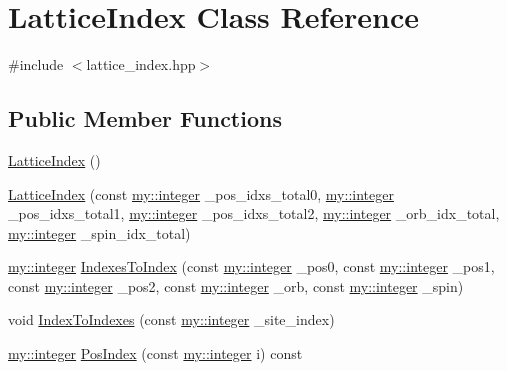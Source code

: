 \hypertarget{classLatticeIndex}{}\section{Lattice\+Index Class Reference}
\label{classLatticeIndex}


{\ttfamily \#include $<$lattice\+\_\+index.\+hpp$>$}

\subsection*{Public Member Functions}
\begin{DoxyCompactItemize}
\item 
\hyperlink{classLatticeIndex_a53dac5f33198813299277518c5adaa23}{Lattice\+Index} ()
\item 
\hyperlink{classLatticeIndex_a0c36fd22f06029d89e622fb6db91c081}{Lattice\+Index} (const \hyperlink{namespacemy_a42365393c537edae1e89d20ff90d1923}{my\+::integer} \+\_\+pos\+\_\+idxs\+\_\+total0, \hyperlink{namespacemy_a42365393c537edae1e89d20ff90d1923}{my\+::integer} \+\_\+pos\+\_\+idxs\+\_\+total1, \hyperlink{namespacemy_a42365393c537edae1e89d20ff90d1923}{my\+::integer} \+\_\+pos\+\_\+idxs\+\_\+total2, \hyperlink{namespacemy_a42365393c537edae1e89d20ff90d1923}{my\+::integer} \+\_\+orb\+\_\+idx\+\_\+total, \hyperlink{namespacemy_a42365393c537edae1e89d20ff90d1923}{my\+::integer} \+\_\+spin\+\_\+idx\+\_\+total)
\item 
\hyperlink{namespacemy_a42365393c537edae1e89d20ff90d1923}{my\+::integer} \hyperlink{classLatticeIndex_ab6a10118b265a84cdcab210380be1fc8}{Indexes\+To\+Index} (const \hyperlink{namespacemy_a42365393c537edae1e89d20ff90d1923}{my\+::integer} \+\_\+pos0, const \hyperlink{namespacemy_a42365393c537edae1e89d20ff90d1923}{my\+::integer} \+\_\+pos1, const \hyperlink{namespacemy_a42365393c537edae1e89d20ff90d1923}{my\+::integer} \+\_\+pos2, const \hyperlink{namespacemy_a42365393c537edae1e89d20ff90d1923}{my\+::integer} \+\_\+orb, const \hyperlink{namespacemy_a42365393c537edae1e89d20ff90d1923}{my\+::integer} \+\_\+spin)
\item 
void \hyperlink{classLatticeIndex_a6a2732056ca5a936bb6080d732aad2ab}{Index\+To\+Indexes} (const \hyperlink{namespacemy_a42365393c537edae1e89d20ff90d1923}{my\+::integer} \+\_\+site\+\_\+index)
\item 
\hyperlink{namespacemy_a42365393c537edae1e89d20ff90d1923}{my\+::integer} \hyperlink{classLatticeIndex_aa9efc6dd08bc0ff61daaf344a226f518}{Pos\+Index} (const \hyperlink{namespacemy_a42365393c537edae1e89d20ff90d1923}{my\+::integer} i) const 

\end{DoxyCompactItemize}
